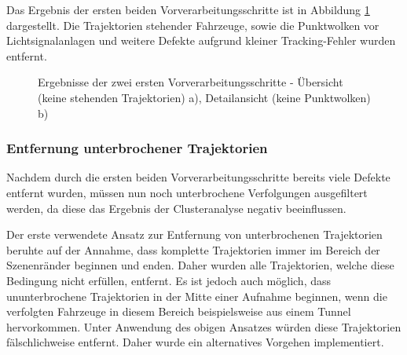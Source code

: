 Das Ergebnis der ersten beiden Vorverarbeitungsschritte ist in Abbildung \ref{fig:real_result_2nd_Prepro} dargestellt.
Die Trajektorien stehender Fahrzeuge, sowie die Punktwolken vor Lichtsignalanlagen und weitere Defekte aufgrund
kleiner Tracking-Fehler wurden entfernt.

\begin{figure}[H]
    \centering
    \qquad \qquad
    \caption[Ergebnisse der zwei ersten Vorverarbeitungsschritte]
            {Ergebnisse der zwei ersten Vorverarbeitungsschritte - Übersicht (keine stehenden Trajektorien) a), Detailansicht (keine Punktwolken) b)}
    \label{fig:real_result_2nd_Prepro}
\end{figure}


\subsubsection{Entfernung unterbrochener Trajektorien}
\label{sec:real1_remove_broken_trajectories}

Nachdem durch die ersten beiden Vorverarbeitungsschritte bereits viele Defekte entfernt wurden,
müssen nun noch unterbrochene Verfolgungen ausgefiltert werden, da diese das Ergebnis der Clusteranalyse
negativ beeinflussen.

Der erste verwendete Ansatz zur Entfernung von unterbrochenen Trajektorien beruhte auf der Annahme,
dass komplette Trajektorien immer im Bereich der Szenenränder beginnen und enden. Daher wurden alle Trajektorien,
welche diese Bedingung nicht erfüllen, entfernt. Es ist jedoch auch möglich, dass ununterbrochene Trajektorien
in der Mitte einer Aufnahme beginnen, wenn die verfolgten Fahrzeuge in diesem Bereich beispielsweise
aus einem Tunnel hervorkommen. Unter Anwendung des obigen Ansatzes würden diese Trajektorien
fälschlichweise entfernt. Daher wurde ein alternatives Vorgehen implementiert.


